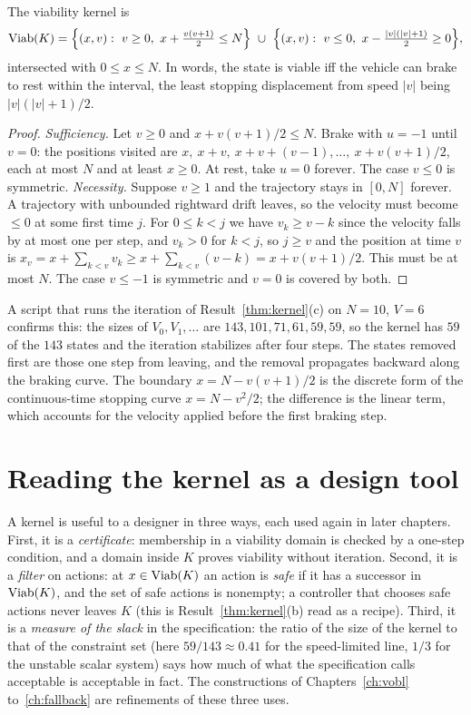 \begin{newresult}\label{prop:stopping}
The viability kernel is
\[
\Viab(K)=\Bigl\{(x,v):\ v\ge0,\ x+\tfrac{v(v+1)}2\le N\Bigr\}\ \cup\ \Bigl\{(x,v):\ v\le0,\ x-\tfrac{|v|(|v|+1)}2\ge0\Bigr\},
\]
intersected with $0\le x\le N$. In words, the state is viable iff the vehicle can brake to rest within the interval, the least stopping displacement from speed $|v|$ being $|v|(|v|+1)/2$.
\end{newresult}
\begin{proof}
\emph{Sufficiency.} Let $v\ge0$ and $x+v(v+1)/2\le N$. Brake with $u=-1$ until $v=0$: the positions visited are $x,\ x+v,\ x+v+(v-1),\dots,\ x+v(v+1)/2$, each at most $N$ and at least $x\ge0$. At rest, take $u=0$ forever. The case $v\le0$ is symmetric. \emph{Necessity.} Suppose $v\ge1$ and the trajectory stays in $[0,N]$ forever. A trajectory with unbounded rightward drift leaves, so the velocity must become $\le 0$ at some first time $j$. For $0\le k<j$ we have $v_k\ge v-k$ since the velocity falls by at most one per step, and $v_k>0$ for $k<j$, so $j\ge v$ and the position at time $v$ is $x_v=x+\sum_{k<v}v_k\ge x+\sum_{k<v}(v-k)=x+v(v+1)/2$. This must be at most $N$. The case $v\le-1$ is symmetric and $v=0$ is covered by both.
\end{proof}

A script that runs the iteration of Result~\ref{thm:kernel}(c) on $N=10$, $V=6$ confirms this: the sizes of $V_0,V_1,\dots$ are $143,101,71,61,59,59$, so the kernel has $59$ of the $143$ states and the iteration stabilizes after four steps. The states removed first are those one step from leaving, and the removal propagates backward along the braking curve. The boundary $x=N-v(v+1)/2$ is the discrete form of the continuous-time stopping curve $x=N-v^2/2$; the difference is the linear term, which accounts for the velocity applied before the first braking step.

\section{Reading the kernel as a design tool}\label{sec:design-kernel}

A kernel is useful to a designer in three ways, each used again in later chapters. First, it is a \emph{certificate}: membership in a viability domain is checked by a one-step condition, and a domain inside $K$ proves viability without iteration. Second, it is a \emph{filter} on actions: at $x\in\operatorname{Viab}(K)$ an action is \emph{safe} if it has a successor in $\operatorname{Viab}(K)$, and the set of safe actions is nonempty; a controller that chooses safe actions never leaves $K$ (this is Result~\ref{thm:kernel}(b) read as a recipe). Third, it is a \emph{measure of the slack} in the specification: the ratio of the size of the kernel to that of the constraint set (here $59/143\approx0.41$ for the speed-limited line, $1/3$ for the unstable scalar system) says how much of what the specification calls acceptable is acceptable in fact. The constructions of Chapters~\ref{ch:vobl} to~\ref{ch:fallback} are refinements of these three uses.

